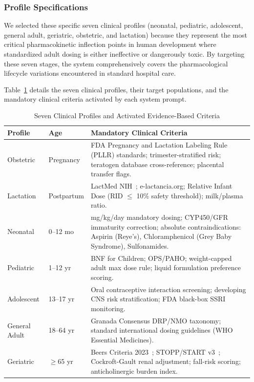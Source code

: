 \documentclass[9pt,conference]{IEEEtran}
\begin{document}
\subsubsection{Profile Specifications}

We selected these specific seven clinical profiles (neonatal, pediatric, adolescent, general adult, geriatric, obstetric, and lactation) because they represent the most critical pharmacokinetic inflection points in human development where standardized adult dosing is either ineffective or dangerously toxic. By targeting these seven stages, the system comprehensively covers the pharmacological lifecycle variations encountered in standard hospital care.

Table~\ref{tab:profiles} details the seven clinical profiles, their target
populations, and the mandatory clinical criteria activated by each system prompt.

\begin{table}[H]
  \centering
  \caption{Seven Clinical Profiles and Activated Evidence-Based Criteria}
  \label{tab:profiles}
  \renewcommand{\arraystretch}{1.2}
  \begin{tabular}{@{}p{1.6cm}p{1.0cm}p{4.8cm}@{}}
    \toprule
    \textbf{Profile} & \textbf{Age} & \textbf{Mandatory Clinical Criteria} \\
    \midrule
    Obstetric
      & Pregnancy
      & FDA Pregnancy and Lactation Labeling Rule (PLLR) standards; 
        trimester-stratified risk; teratogen database cross-reference; 
        placental transfer flags. \\[2pt]
    Lactation
      & Postpartum
      & LactMed NIH~\cite{lactmed}; e-lactancia.org; Relative Infant
        Dose (RID $\leq$ 10\% safety threshold); milk/plasma ratio. \\[2pt]
    Neonatal
      & 0--12 mo
      & mg/kg/day mandatory dosing; CYP450/GFR immaturity correction;
        absolute contraindications: Aspirin (Reye's), Chloramphenicol
        (Grey Baby Syndrome), Sulfonamides. \\[2pt]
    Pediatric
      & 1--12 yr
      & BNF for Children; OPS/PAHO; weight-capped adult max dose rule;
        liquid formulation preference scoring. \\[2pt]
    Adolescent
      & 13--17 yr
      & Oral contraceptive interaction screening; developing CNS risk
        stratification; FDA black-box SSRI monitoring. \\[2pt]
    General Adult
      & 18--64 yr
      & Granada Consensus DRP/NMO taxonomy; standard international
        dosing guidelines (WHO Essential Medicines). \\[2pt]
    Geriatric
      & $\geq$65 yr
      & Beers Criteria 2023~\cite{samuel20232023}; STOPP/START v3~\cite{o2023stopp};
        Cockroft-Gault renal adjustment; fall-risk scoring;
        anticholinergic burden index. \\
    \bottomrule
  \end{tabular}
\end{table}
\end{document}
